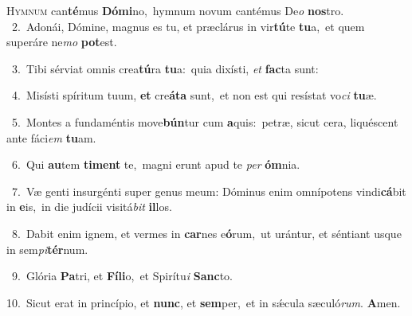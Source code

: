 \lettrine{\initial\textcolor{\initialcolor}{H}}{ymnum} can\-\textbf{té}\-mus \textbf{Dó}\-\textbf{mi}no,~\star hymnum novum cantémus De\textit{o} \textbf{nos}\-tro.\\
{\numbfont\textcolor{\numbcolor}{~2.}}~Adonái, Dómine, magnus es tu, et præclárus in vir\-\textbf{tú}\-te \textbf{tu}\-a,~\star et quem superáre ne\textit{mo} \textbf{pot}\-est.\par
{\numbfont\textcolor{\numbcolor}{~3.}}~Tibi sérviat omnis crea\-\textbf{tú}\-ra \textbf{tu}\-a:~\star quia dixísti, \textit{et} \textbf{fac}\-ta sunt:\par
{\numbfont\textcolor{\numbcolor}{~4.}}~Misísti spíritum tuum, \textbf{et} cre\-\textbf{á}\-\textbf{ta} sunt,~\star et non est qui resístat vo\textit{ci} \textbf{tu}\-æ.\par
{\numbfont\textcolor{\numbcolor}{~5.}}~Montes a fundaméntis move\-\textbf{bún}\-tur cum \textbf{a}\-quis:~\star petræ, sicut cera, liquéscent ante fáci\textit{em} \textbf{tu}\-am.\par
{\numbfont\textcolor{\numbcolor}{~6.}}~Qui \textbf{au}\-tem \textbf{ti}\-\textbf{ment} te,~\star magni erunt apud te \textit{per} \textbf{óm}\-nia.\par
{\numbfont\textcolor{\numbcolor}{~7.}}~Væ genti insurgénti super genus meum: Dóminus enim omnípotens vindi\-\textbf{cá}\-bit in \textbf{e}\-is,~\star in die judícii visitá\textit{bit} \textbf{il}\-los.\par
{\numbfont\textcolor{\numbcolor}{~8.}}~Dabit enim ignem, et vermes in \textbf{car}\-nes e\-\textbf{ó}\-rum,~\star ut urántur, et séntiant usque in sem\-\textit{pi}\-\textbf{tér}num.\par
{\numbfont\textcolor{\numbcolor}{~9.}}~Glória \textbf{Pa}\-tri, et \textbf{Fí}\-\textbf{li}o,~\star et Spirítu\textit{i} \textbf{Sanc}\-to.\par
{\numbfont\textcolor{\numbcolor}{10.}}~Sicut erat in princípio, et \textbf{nunc}\-, et \textbf{sem}\-per,~\star et in sǽcula sæculó\-\textit{rum}\-. \textbf{A}\-men.\par
